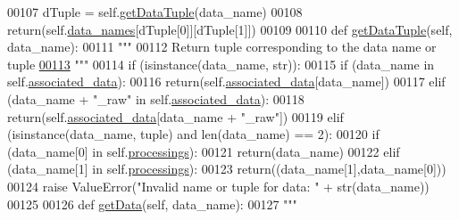 \begin{DoxyCode}
00107         dTuple = self.\hyperlink{classnavicom_1_1navicom_1_1NaviCom_ad8ac5b74afb4ceb6ed094604787d4d19}{getDataTuple}(data\_name)
00108         \textcolor{keywordflow}{return}(self.\hyperlink{classnavicom_1_1navicom_1_1NaviCom_a68646454fe1481b0065d2f43548319df}{data_names}[dTuple[0]][dTuple[1]])
00109 
00110     \textcolor{keyword}{def }\hyperlink{classnavicom_1_1navicom_1_1NaviCom_ad8ac5b74afb4ceb6ed094604787d4d19}{getDataTuple}(self, data\_name):
00111         \textcolor{stringliteral}{"""}
00112 \textcolor{stringliteral}{        Return tuple corresponding to the data name or tuple}
\hypertarget{navicom_8py_source_l00113}{}\hyperlink{classnavicom_1_1navicom_1_1NaviCom_ad8ac5b74afb4ceb6ed094604787d4d19}{00113} \textcolor{stringliteral}{        """}
00114         \textcolor{keywordflow}{if} (isinstance(data\_name, str)):
00115             \textcolor{keywordflow}{if} (data\_name \textcolor{keywordflow}{in} self.\hyperlink{classnavicom_1_1navicom_1_1NaviCom_a1d7072ae29e32d7ddd1da9cc5def7199}{associated_data}):
00116                 \textcolor{keywordflow}{return}(self.\hyperlink{classnavicom_1_1navicom_1_1NaviCom_a1d7072ae29e32d7ddd1da9cc5def7199}{associated_data}[data\_name])
00117             \textcolor{keywordflow}{elif} (data\_name + \textcolor{stringliteral}{"\_raw"} \textcolor{keywordflow}{in} self.\hyperlink{classnavicom_1_1navicom_1_1NaviCom_a1d7072ae29e32d7ddd1da9cc5def7199}{associated_data}):
00118                 \textcolor{keywordflow}{return}(self.\hyperlink{classnavicom_1_1navicom_1_1NaviCom_a1d7072ae29e32d7ddd1da9cc5def7199}{associated_data}[data\_name + \textcolor{stringliteral}{"\_raw"}])
00119         \textcolor{keywordflow}{elif} (isinstance(data\_name, tuple) \textcolor{keywordflow}{and} len(data\_name) == 2):
00120             \textcolor{keywordflow}{if} (data\_name[0] \textcolor{keywordflow}{in} self.\hyperlink{classnavicom_1_1navicom_1_1NaviCom_a5a255d56e997ddcc653d8f06c741ea13}{processings}):
00121                 \textcolor{keywordflow}{return}(data\_name)
00122             \textcolor{keywordflow}{elif} (data\_name[1] \textcolor{keywordflow}{in} self.\hyperlink{classnavicom_1_1navicom_1_1NaviCom_a5a255d56e997ddcc653d8f06c741ea13}{processings}):
00123                 \textcolor{keywordflow}{return}((data\_name[1],data\_name[0]))
00124         \textcolor{keywordflow}{raise} ValueError(\textcolor{stringliteral}{"Invalid name or tuple for data: "} + str(data\_name))
00125 
00126     \textcolor{keyword}{def }\hyperlink{classnavicom_1_1navicom_1_1NaviCom_ad675e899836271ff4f2fd4bd17ea81d9}{getData}(self, data\_name):
00127         \textcolor{stringliteral}{"""}

\end{DoxyCode}
